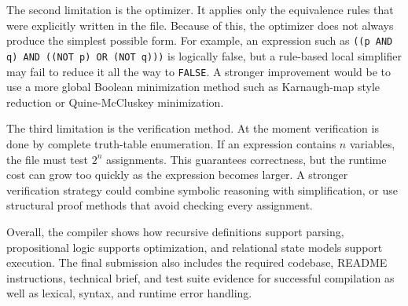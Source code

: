 \documentclass[10pt]{article}
\begin{document}
The second limitation is the optimizer. It applies only the equivalence rules that were explicitly written in the file. Because of this, the optimizer does not always produce the simplest possible form. For example, an expression such as \texttt{((p AND q) AND ((NOT p) OR (NOT q)))} is logically false, but a rule-based local simplifier may fail to reduce it all the way to \texttt{FALSE}. A stronger improvement would be to use a more global Boolean minimization method such as Karnaugh-map style reduction or Quine-McCluskey minimization.

The third limitation is the verification method. At the moment verification is done by complete truth-table enumeration. If an expression contains \(n\) variables, the file must test \(2^n\) assignments. This guarantees correctness, but the runtime cost can grow too quickly as the expression becomes larger. A stronger verification strategy could combine symbolic reasoning with simplification, or use structural proof methods that avoid checking every assignment.

Overall, the compiler shows how recursive definitions support parsing, propositional logic supports optimization, and relational state models support execution. The final submission also includes the required codebase, README instructions, technical brief, and test suite evidence for successful compilation as well as lexical, syntax, and runtime error handling.
\end{document}
